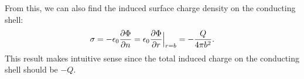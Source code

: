 From this, we can also find the induced surface charge density on the conducting shell:
\begin{eqnarray}
    \sigma = - \epsilon_0 \pdv{\Phi}{n} = \epsilon_0 \pdv{\Phi}{r}\Big|_{r = b} = -\frac{Q}{4 \pi b^2}
.\end{eqnarray}
This result makes intuitive sense since the total induced charge on the conducting shell should be $-Q$.






















